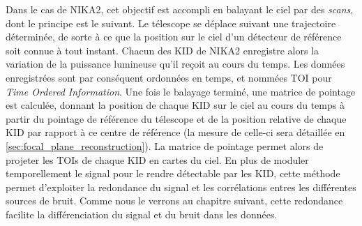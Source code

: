 Dans le cas de NIKA2, cet objectif est accompli en balayant le ciel par des \textit{scans}, dont le principe est le suivant.
Le télescope se déplace suivant une trajectoire déterminée, de sorte à ce que la position sur le ciel d'un détecteur de référence soit connue à tout instant.
Chacun des KID de NIKA2 enregistre alors la variation de la puissance lumineuse qu'il reçoit au cours du temps.
Les données enregistrées sont par conséquent ordonnées en temps, et nommées TOI pour \textit{Time Ordered Information}.
Une fois le balayage terminé, une matrice de pointage est calculée, donnant la position de chaque KID sur le ciel au cours du temps à partir du pointage de référence du télescope et de la position relative de chaque KID par rapport à ce centre de référence (la mesure de celle-ci sera détaillée en \ref{sec:focal_plane_reconstruction}).
La matrice de pointage permet alors de projeter les TOIs de chaque KID en cartes du ciel.
En plus de moduler temporellement le signal pour le rendre détectable par les KID, cette méthode permet d'exploiter la redondance du signal et les corrélations entres les différentes sources de bruit.
Comme nous le verrons au chapitre suivant, cette redondance facilite la différenciation du signal et du bruit dans les données.

